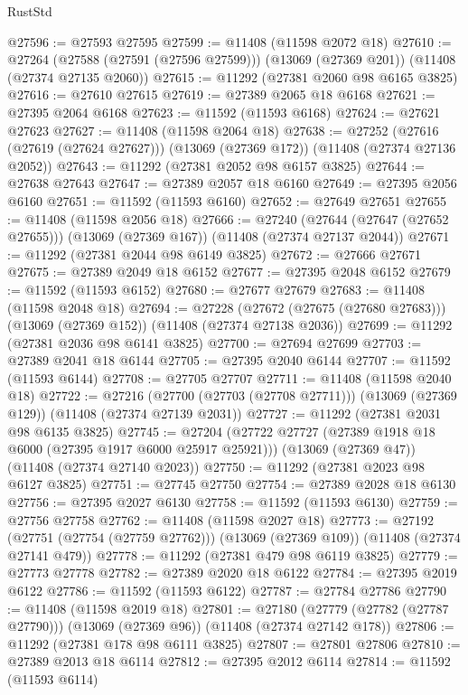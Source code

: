 \begin{lexlean}{RustStd}
\begin{coremodule}
@27596 := @27593 @27595
@27599 := @11408 (@11598 @2072 @18)
@27610 := @27264
    (@27588 (@27591 (@27596 @27599)))
    (@13069 (@27369 @201))
    (@11408 (@27374 @27135 @2060))
@27615 := @11292 (@27381 @2060 @98 @6165 @3825)
@27616 := @27610 @27615
@27619 := @27389 @2065 @18 @6168
@27621 := @27395 @2064 @6168
@27623 := @11592 (@11593 @6168)
@27624 := @27621 @27623
@27627 := @11408 (@11598 @2064 @18)
@27638 := @27252
    (@27616 (@27619 (@27624 @27627)))
    (@13069 (@27369 @172))
    (@11408 (@27374 @27136 @2052))
@27643 := @11292 (@27381 @2052 @98 @6157 @3825)
@27644 := @27638 @27643
@27647 := @27389 @2057 @18 @6160
@27649 := @27395 @2056 @6160
@27651 := @11592 (@11593 @6160)
@27652 := @27649 @27651
@27655 := @11408 (@11598 @2056 @18)
@27666 := @27240
    (@27644 (@27647 (@27652 @27655)))
    (@13069 (@27369 @167))
    (@11408 (@27374 @27137 @2044))
@27671 := @11292 (@27381 @2044 @98 @6149 @3825)
@27672 := @27666 @27671
@27675 := @27389 @2049 @18 @6152
@27677 := @27395 @2048 @6152
@27679 := @11592 (@11593 @6152)
@27680 := @27677 @27679
@27683 := @11408 (@11598 @2048 @18)
@27694 := @27228
    (@27672 (@27675 (@27680 @27683)))
    (@13069 (@27369 @152))
    (@11408 (@27374 @27138 @2036))
@27699 := @11292 (@27381 @2036 @98 @6141 @3825)
@27700 := @27694 @27699
@27703 := @27389 @2041 @18 @6144
@27705 := @27395 @2040 @6144
@27707 := @11592 (@11593 @6144)
@27708 := @27705 @27707
@27711 := @11408 (@11598 @2040 @18)
@27722 := @27216
    (@27700 (@27703 (@27708 @27711)))
    (@13069 (@27369 @129))
    (@11408 (@27374 @27139 @2031))
@27727 := @11292 (@27381 @2031 @98 @6135 @3825)
@27745 := @27204
    (@27722 @27727 (@27389 @1918 @18 @6000 (@27395 @1917 @6000 @25917 @25921)))
    (@13069 (@27369 @47))
    (@11408 (@27374 @27140 @2023))
@27750 := @11292 (@27381 @2023 @98 @6127 @3825)
@27751 := @27745 @27750
@27754 := @27389 @2028 @18 @6130
@27756 := @27395 @2027 @6130
@27758 := @11592 (@11593 @6130)
@27759 := @27756 @27758
@27762 := @11408 (@11598 @2027 @18)
@27773 := @27192
    (@27751 (@27754 (@27759 @27762)))
    (@13069 (@27369 @109))
    (@11408 (@27374 @27141 @479))
@27778 := @11292 (@27381 @479 @98 @6119 @3825)
@27779 := @27773 @27778
@27782 := @27389 @2020 @18 @6122
@27784 := @27395 @2019 @6122
@27786 := @11592 (@11593 @6122)
@27787 := @27784 @27786
@27790 := @11408 (@11598 @2019 @18)
@27801 := @27180
    (@27779 (@27782 (@27787 @27790)))
    (@13069 (@27369 @96))
    (@11408 (@27374 @27142 @178))
@27806 := @11292 (@27381 @178 @98 @6111 @3825)
@27807 := @27801 @27806
@27810 := @27389 @2013 @18 @6114
@27812 := @27395 @2012 @6114
@27814 := @11592 (@11593 @6114)

\end{coremodule}
\end{lexlean}
